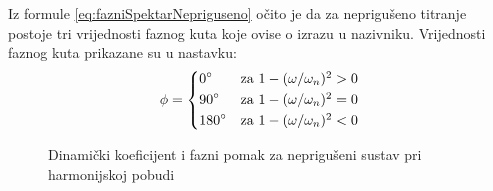 Iz formule \eqref{eq:fazniSpektarNepriguseno} očito je da za neprigušeno titranje
postoje tri vrijednosti faznog kuta koje ovise o izrazu u nazivniku. Vrijednosti
faznog kuta prikazane su u nastavku:
\[
    \phi = \begin{dcases*}
            0\degree   & za $1-(\omega/\omega_n)^2 > 0$\\ %
            90\degree  & za $1-(\omega/\omega_n)^2 = 0$\\ %
            180\degree & za $1-(\omega/\omega_n)^2 < 0$\\ %
        \end{dcases*}
\]

\begin{figure}[H]
    \begin{subfigure}{1\textwidth}
        
    \end{subfigure}
    \vfill
    \begin{subfigure}{1\textwidth}
        
    \end{subfigure}
    \caption{Dinamički koeficijent i fazni pomak za neprigušeni sustav pri
    harmonijskoj pobudi}
    \label{fig:frf-nepriguseno}
\end{figure}
\newpage

